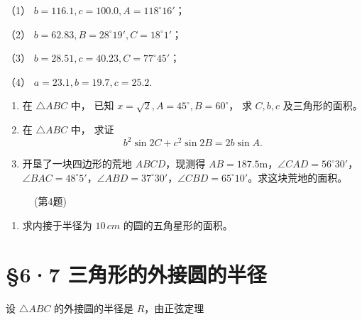 （1） \(b = 116.1, c = 100.0, A = 118^{\circ}16'\)；

（2） \(b = 62.83, B = 28^{\circ}19', C = 18^{\circ}1'\)；

（3） \(b = 28.51, c = 40.23, C = 77^{\circ}45'\)；

（4） \(a = 23.1, b = 19.7, c = 25.2.\)

\begin{enumerate}[start=2]
\item
  在 \(\triangle ABC\) 中， 已知
  \(x = \sqrt{2}, A = 45^{\circ}, B = 60^{\circ}\)， 求 \(C, b, c\)
  及三角形的面积。
\item
  在 \(\triangle ABC\) 中， 求证
\[
b ^ {2} \sin 2 C + c ^ {2} \sin 2 B = 2 b \sin A.
\]
\item
  开垦了一块四边形的荒地 \(ABCD\)，现测得
  \(AB = 187.5\mathrm{m}\)，\(\angle CAD = 56^{\circ}30'\)，\(\angle BAC = 48^{\circ}5'\)，\(\angle ABD = 37^{\circ}30'\)，\(\angle CBD = 65^{\circ}10'\)。求这块荒地的面积。
\end{enumerate}

\begin{figure}
\centering
{}
\caption{(第4题)}
\end{figure}


\begin{enumerate}[start=5]
\item
  求内接于半径为 \(10 \, cm\) 的圆的五角星形的面积。
\end{enumerate}

\section{§6·7 三角形的外接圆的半径}

设 \(\triangle ABC\) 的外接圆的半径是 \(R\)，由正弦定理

